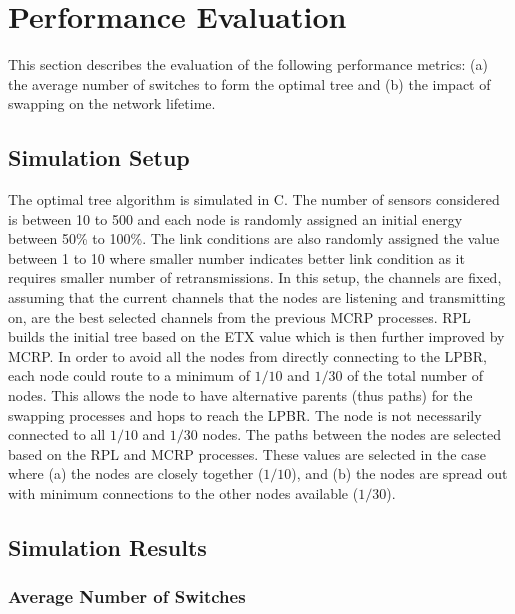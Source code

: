 \section{Performance Evaluation}
\label{PerformanceEvaluation}

This section describes the evaluation of the following performance metrics: (a) the average number of switches to form the optimal tree and (b) the impact of swapping on the network lifetime.  


\subsection{Simulation Setup}

The optimal tree algorithm is simulated in C. The number of sensors considered is between 10 to 500 and each node is randomly assigned an initial energy between 50\% to 100\%. The link conditions are also randomly assigned the value between 1 to 10 where smaller number indicates better link condition as it requires smaller number of retransmissions. In this setup, the channels are fixed, assuming that the current channels that the nodes are listening and transmitting on, are the best selected channels from the previous MCRP processes. RPL builds the initial tree based on the ETX value which is then further improved by MCRP. In order to avoid all the nodes from directly connecting to the LPBR, each node could route to a minimum of $1/10$ and $1/30$ of the total number of nodes. %
This allows the node to have alternative parents (thus paths) for the swapping processes and hops to reach the LPBR. The node is not necessarily connected to all $1/10$ and $1/30$ nodes. The paths between the nodes are selected based on the RPL and MCRP processes. These values are selected in the case where (a) the nodes are closely together ($1/10$), and (b) the nodes are spread out with minimum connections to the other nodes available ($1/30$). 

\subsection{Simulation Results}
\subsubsection{Average Number of Switches}


